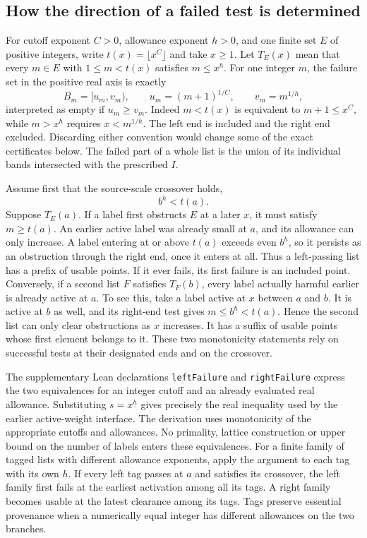 \documentclass[12pt,letterpaper]{article}
\begin{document}
\subsection{How the direction of a failed test is determined}
For cutoff exponent \(C>0\), allowance exponent \(h>0\), and one finite set \(E\) of positive integers, write \(t(x)=\lfloor x^C\rfloor\) and take \(x\ge1\). Let \(T_E(x)\) mean that every \(m\in E\) with \(1\le m<t(x)\) satisfies \(m\le x^h\). For one integer \(m\), the failure set in the positive real axis is exactly
\begin{equation}
 B_m=[u_m,v_m),\qquad
 u_m=(m+1)^{1/C},\qquad v_m=m^{1/h},
 \label{eq:stitch-band}
\end{equation}
interpreted as empty if \(u_m\ge v_m\). Indeed \(m<t(x)\) is equivalent to \(m+1\le x^C\), while \(m>x^h\) requires \(x<m^{1/h}\). The left end is included and the right end excluded. Discarding either convention would change some of the exact certificates below. The failed part of a whole list is the union of its individual bands intersected with the prescribed \(I\).

Assume first that the source-scale crossover holds,
\begin{equation}
                        b^h<t(a).
 \label{eq:stitch-cross}
\end{equation}
Suppose \(T_E(a)\). If a label first obstructs \(E\) at a later \(x\), it must satisfy \(m\ge t(a)\). An earlier active label was already small at \(a\), and its allowance can only increase. A label entering at or above \(t(a)\) exceeds even \(b^h\), so it persists as an obstruction through the right end, once it enters at all. Thus a left-passing list has a prefix of usable points. If it ever fails, its first failure is an included point. Conversely, if a second list \(F\) satisfies \(T_F(b)\), every label actually harmful earlier is already active at \(a\). To see this, take a label active at \(x\) between \(a\) and \(b\). It is active at \(b\) as well, and its right-end test gives \(m\le b^h<t(a)\). Hence the second list can only clear obstructions as \(x\) increases. It has a suffix of usable points whose first element belongs to it. These two monotonicity statements rely on successful tests at their designated ends and on the crossover.

The supplementary Lean declarations \texttt{leftFailure} and \texttt{rightFailure} express the two equivalences for an integer cutoff and an already evaluated real allowance. Substituting \(s=x^h\) gives precisely the real inequality used by the earlier active-weight interface. The derivation uses monotonicity of the appropriate cutoffs and allowances. No primality, lattice construction or upper bound on the number of labels enters these equivalences. For a finite family of tagged lists with different allowance exponents, apply the argument to each tag with its own \(h\). If every left tag passes at \(a\) and satisfies its crossover, the left family first fails at the earliest activation among all its tags. A right family becomes usable at the latest clearance among its tags. Tags preserve essential provenance when a numerically equal integer has different allowances on the two branches.
\end{document}
